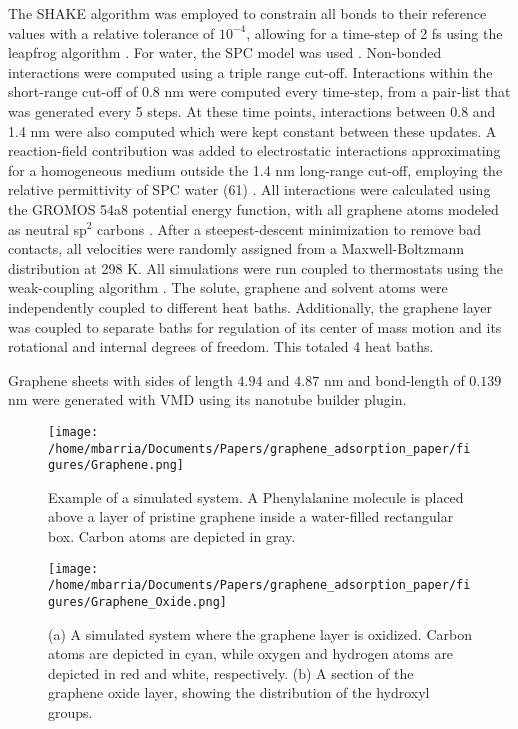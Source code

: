 \documentclass[twoside,twocolumn,9pt]{article}
\begin{document}
The SHAKE algorithm \cite{Ryckaert_1977} was employed to constrain all
bonds to their reference values with a relative tolerance of
$10^{-4}$, allowing for a time-step of 2 fs using the leapfrog
algorithm \cite{Hockney_1977}.  For water, the SPC model was used
\cite{Berendsen_1981}.  Non-bonded interactions were computed using a
triple range cut-off. Interactions within the short-range cut-off of
0.8 nm were computed every time-step, from a pair-list that was
generated every 5 steps.  At these time points, interactions between
0.8 and 1.4 nm were also computed which were kept constant between
these updates.  A reaction-field contribution was added to
electrostatic interactions approximating for a homogeneous medium
outside the 1.4 nm long-range cut-off, employing the relative
permittivity of SPC water (61) \cite{Tironi_1995}. All interactions
were calculated using the GROMOS 54a8 potential energy function, with
all graphene atoms modeled as neutral sp$^2$ carbons \cite{Reif_2012}.
After a steepest-descent minimization to remove bad contacts, all
velocities were randomly assigned from a Maxwell-Boltzmann
distribution at 298 K.  All simulations were run coupled to
thermostats using the weak-coupling algorithm
\cite{Berendsen_1984}. The solute, graphene and solvent atoms were
independently coupled to different heat baths. Additionally, the
graphene layer was coupled to separate baths for regulation of its
center of mass motion and its rotational and internal degrees of
freedom. This totaled 4 heat baths.

Graphene sheets with sides of length $4.94$ and $4.87$ nm and
bond-length of $0.139$ nm were generated with VMD\cite{Humphrey_1996}
using its nanotube builder plugin.

\begin{figure}[htbp]
\centerline{\texttt{[image: /home/mbarria/Documents/Papers/graphene\_adsorption\_paper/figures/Graphene.png]}}
\caption[]{\label{fig:system-pristine} Example of a simulated
  system. A Phenylalanine molecule is placed above a layer of pristine
  graphene inside a water-filled rectangular box. Carbon atoms are
  depicted in gray.}
\end{figure}

\begin{figure}[htbp]
\centerline{\texttt{[image: /home/mbarria/Documents/Papers/graphene\_adsorption\_paper/figures/Graphene\_Oxide.png]}}
\caption[]{\label{fig:system-oxide} (a) A simulated system where the
  graphene layer is oxidized. Carbon atoms are depicted in cyan, while
oxygen and hydrogen atoms are depicted in red and white,
respectively. (b) A section of the graphene oxide layer, showing the
distribution of the hydroxyl groups.}
\end{figure}
\end{document}

